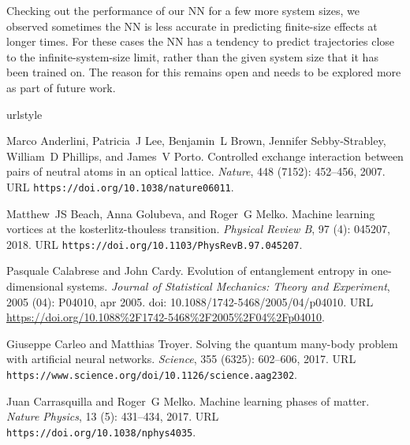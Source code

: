 \documentclass[a4paper,aps,amsmath,amssymb,twocolumn,longbibliography,,accepted=2022-05-17]{quantumarticle}
\begin{document}
Checking out the performance of our NN  for a few more system sizes, we observed sometimes the NN is less accurate in predicting finite-size effects at longer times. For these cases the NN has a tendency to predict trajectories close to the infinite-system-size limit, rather than the given system size that it has been trained on. The reason for this remains open and needs to be explored more as part of future work.

%
\providecommand{\noopsort}[1]{}\providecommand{\singleletter}[1]{#1}%
\begin{thebibliography}{52}
\providecommand{\natexlab}[1]{#1}
\providecommand{\url}[1]{\texttt{#1}}
\expandafter\ifx\csname urlstyle\endcsname\relax
  \providecommand{\doi}[1]{doi: #1}\else
  \providecommand{\doi}{doi: \begingroup \urlstyle{rm}\Url}\fi

Marco Anderlini, Patricia~J Lee, Benjamin~L Brown, Jennifer Sebby-Strabley,
  William~D Phillips, and James~V Porto.
\newblock Controlled exchange interaction between pairs of neutral atoms in an
  optical lattice.
\newblock \emph{Nature}, 448 (7152): 452--456, 2007.
\newblock URL \url{https://doi.org/10.1038/nature06011}.

Matthew~JS Beach, Anna Golubeva, and Roger~G Melko.
\newblock Machine learning vortices at the kosterlitz-thouless transition.
\newblock \emph{Physical Review B}, 97 (4): 045207, 2018.
\newblock URL \url{https://doi.org/10.1103/PhysRevB.97.045207}.

Pasquale Calabrese and John Cardy.
\newblock Evolution of entanglement entropy in one-dimensional systems.
\newblock \emph{Journal of Statistical Mechanics: Theory and Experiment},
  2005 (04): P04010, apr 2005.
\newblock \doi{10.1088/1742-5468/2005/04/p04010}.
\newblock URL \url{https://doi.org/10.1088%2F1742-5468%2F2005%2F04%2Fp04010}.

Giuseppe Carleo and Matthias Troyer.
\newblock Solving the quantum many-body problem with artificial neural
  networks.
\newblock \emph{Science}, 355 (6325): 602--606, 2017.
\newblock URL \url{https://www.science.org/doi/10.1126/science.aag2302}.

Juan Carrasquilla and Roger~G Melko.
\newblock Machine learning phases of matter.
\newblock \emph{Nature Physics}, 13 (5): 431--434, 2017.
\newblock URL \url{https://doi.org/10.1038/nphys4035}.


\end{thebibliography}
\end{document}
